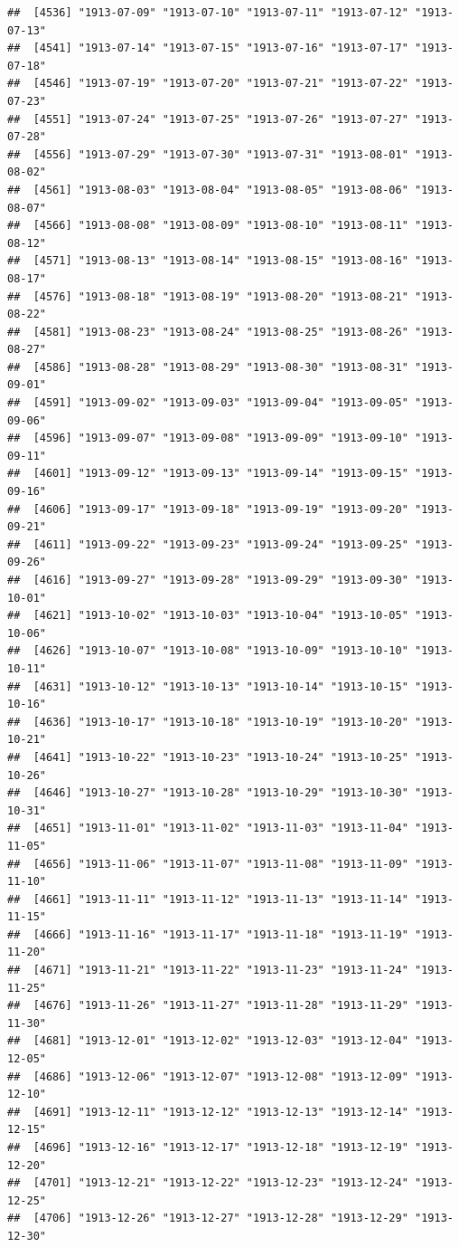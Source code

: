 \documentclass{article}\usepackage[]{graphicx}\usepackage[]{color}
\makeatletter
\newenvironment{kframe}{%
 \def\at@end@of@kframe{}%
 \ifinner\ifhmode%
  \def\at@end@of@kframe{\end{minipage}}%
  \begin{minipage}{\columnwidth}%
 \fi\fi%
 \def\FrameCommand##1{\hskip\@totalleftmargin \hskip-\fboxsep
 \colorbox{shadecolor}{##1}\hskip-\fboxsep
     \hskip-\linewidth \hskip-\@totalleftmargin \hskip\columnwidth}%
 \MakeFramed {\advance\hsize-\width
   \@totalleftmargin\z@ \linewidth\hsize
   \@setminipage}}%
 {\par\unskip\endMakeFramed%
 \at@end@of@kframe}
\newenvironment{knitrout}{}{} %
\makeatother
\begin{document}
\begin{description}
\begin{knitrout}
\begin{kframe}
\begin{verbatim}
##  [4536] "1913-07-09" "1913-07-10" "1913-07-11" "1913-07-12" "1913-07-13"
##  [4541] "1913-07-14" "1913-07-15" "1913-07-16" "1913-07-17" "1913-07-18"
##  [4546] "1913-07-19" "1913-07-20" "1913-07-21" "1913-07-22" "1913-07-23"
##  [4551] "1913-07-24" "1913-07-25" "1913-07-26" "1913-07-27" "1913-07-28"
##  [4556] "1913-07-29" "1913-07-30" "1913-07-31" "1913-08-01" "1913-08-02"
##  [4561] "1913-08-03" "1913-08-04" "1913-08-05" "1913-08-06" "1913-08-07"
##  [4566] "1913-08-08" "1913-08-09" "1913-08-10" "1913-08-11" "1913-08-12"
##  [4571] "1913-08-13" "1913-08-14" "1913-08-15" "1913-08-16" "1913-08-17"
##  [4576] "1913-08-18" "1913-08-19" "1913-08-20" "1913-08-21" "1913-08-22"
##  [4581] "1913-08-23" "1913-08-24" "1913-08-25" "1913-08-26" "1913-08-27"
##  [4586] "1913-08-28" "1913-08-29" "1913-08-30" "1913-08-31" "1913-09-01"
##  [4591] "1913-09-02" "1913-09-03" "1913-09-04" "1913-09-05" "1913-09-06"
##  [4596] "1913-09-07" "1913-09-08" "1913-09-09" "1913-09-10" "1913-09-11"
##  [4601] "1913-09-12" "1913-09-13" "1913-09-14" "1913-09-15" "1913-09-16"
##  [4606] "1913-09-17" "1913-09-18" "1913-09-19" "1913-09-20" "1913-09-21"
##  [4611] "1913-09-22" "1913-09-23" "1913-09-24" "1913-09-25" "1913-09-26"
##  [4616] "1913-09-27" "1913-09-28" "1913-09-29" "1913-09-30" "1913-10-01"
##  [4621] "1913-10-02" "1913-10-03" "1913-10-04" "1913-10-05" "1913-10-06"
##  [4626] "1913-10-07" "1913-10-08" "1913-10-09" "1913-10-10" "1913-10-11"
##  [4631] "1913-10-12" "1913-10-13" "1913-10-14" "1913-10-15" "1913-10-16"
##  [4636] "1913-10-17" "1913-10-18" "1913-10-19" "1913-10-20" "1913-10-21"
##  [4641] "1913-10-22" "1913-10-23" "1913-10-24" "1913-10-25" "1913-10-26"
##  [4646] "1913-10-27" "1913-10-28" "1913-10-29" "1913-10-30" "1913-10-31"
##  [4651] "1913-11-01" "1913-11-02" "1913-11-03" "1913-11-04" "1913-11-05"
##  [4656] "1913-11-06" "1913-11-07" "1913-11-08" "1913-11-09" "1913-11-10"
##  [4661] "1913-11-11" "1913-11-12" "1913-11-13" "1913-11-14" "1913-11-15"
##  [4666] "1913-11-16" "1913-11-17" "1913-11-18" "1913-11-19" "1913-11-20"
##  [4671] "1913-11-21" "1913-11-22" "1913-11-23" "1913-11-24" "1913-11-25"
##  [4676] "1913-11-26" "1913-11-27" "1913-11-28" "1913-11-29" "1913-11-30"
##  [4681] "1913-12-01" "1913-12-02" "1913-12-03" "1913-12-04" "1913-12-05"
##  [4686] "1913-12-06" "1913-12-07" "1913-12-08" "1913-12-09" "1913-12-10"
##  [4691] "1913-12-11" "1913-12-12" "1913-12-13" "1913-12-14" "1913-12-15"
##  [4696] "1913-12-16" "1913-12-17" "1913-12-18" "1913-12-19" "1913-12-20"
##  [4701] "1913-12-21" "1913-12-22" "1913-12-23" "1913-12-24" "1913-12-25"
##  [4706] "1913-12-26" "1913-12-27" "1913-12-28" "1913-12-29" "1913-12-30"

\end{verbatim}
\end{kframe}
\end{knitrout}
\end{description}
\end{document}
